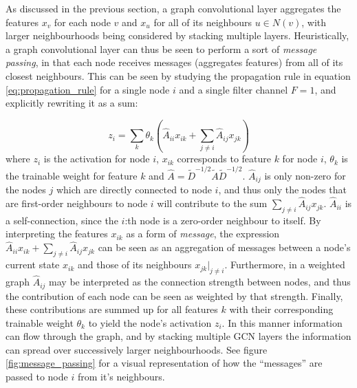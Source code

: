 As discussed in the previous section, a graph convolutional layer aggregates the features $x_v$ for each node $v$ and $x_u$ for all of its neighbours $u \in N(v)$, with larger neighbourhoods being considered by stacking multiple layers. Heuristically, a graph convolutional layer can thus be seen to perform a sort of \textit{message passing}, in that each node receives messages (aggregates features) from all of its closest neighbours. This can be seen by studying the propagation rule in equation \eqref{eq:propagation_rule} for a single node $i$ and a single filter channel $F=1$, and explicitly rewriting it as a sum: 

\begin{equation}
    z_i = \sum_k \theta_k \left(\hat{A}_{ii} x_{ik} + \sum_{j \neq i} \hat{A}_{ij} x_{jk} \right)
\end{equation}
where $z_i$ is the activation for node $i$, $x_{ik}$ corresponds to feature $k$ for node $i$, $\theta_k$ is the trainable weight for feature $k$ and $\hat{A} = \tilde{D}^{-1/2} \tilde{A} \tilde{D}^{-1/2}$. $\hat{A}_{ij}$ is only non-zero for the nodes $j$ which are directly connected to node $i$, and thus only the nodes that are first-order neighbours to node $i$ will contribute to the sum $\sum_{j \neq i} \hat{A}_{ij} x_{jk}$. $\hat{A}_{ii}$ is a self-connection, since the $i$:th node is a zero-order neighbour to itself.
By interpreting the features $x_{ik}$ as a form of \textit{message}, the expression $\hat{A}_{ii} x_{ik} + \sum_{j \neq i} \hat{A}_{ij} x_{jk}$ can be seen as an aggregation of messages between a node's current state $x_{ik}$ and those of its neighbours $x_{jk}\left.\right\rvert_{j\neq i}$. Furthermore, in a weighted graph $\hat{A}_{ij}$ may be interpreted as the connection strength between nodes, and thus the contribution of each node can be seen as weighted by that strength. Finally, these contributions are summed up for all features $k$ with their corresponding trainable weight $\theta_k$ to yield the node's activation $z_i$. In this manner information can flow through the graph, and by stacking multiple GCN layers the information can spread over successively larger neighbourhoods. See figure \ref{fig:message_passing} for a visual representation of how the ``messages'' are passed to node $i$ from it's neighbours.

